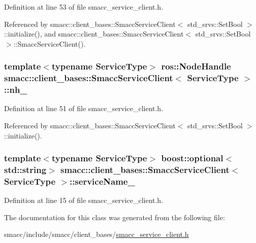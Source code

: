 Definition at line 53 of file smacc\+\_\+service\+\_\+client.\+h.



Referenced by smacc\+::client\+\_\+bases\+::\+Smacc\+Service\+Client$<$ std\+\_\+srvs\+::\+Set\+Bool $>$\+::initialize(), and smacc\+::client\+\_\+bases\+::\+Smacc\+Service\+Client$<$ std\+\_\+srvs\+::\+Set\+Bool $>$\+::\+Smacc\+Service\+Client().

\subsubsection[{\texorpdfstring{nh\+\_\+}{nh_}}]{\setlength{\rightskip}{0pt plus 5cm}template$<$typename Service\+Type$>$ ros\+::\+Node\+Handle {\bf smacc\+::client\+\_\+bases\+::\+Smacc\+Service\+Client}$<$ Service\+Type $>$\+::nh\+\_\+\hspace{0.3cm}{\ttfamily [protected]}}\hypertarget{classsmacc_1_1client__bases_1_1SmaccServiceClient_afb62982383b8269c7962cd1588537489}{}\label{classsmacc_1_1client__bases_1_1SmaccServiceClient_afb62982383b8269c7962cd1588537489}


Definition at line 51 of file smacc\+\_\+service\+\_\+client.\+h.



Referenced by smacc\+::client\+\_\+bases\+::\+Smacc\+Service\+Client$<$ std\+\_\+srvs\+::\+Set\+Bool $>$\+::initialize().

\subsubsection[{\texorpdfstring{service\+Name\+\_\+}{serviceName_}}]{\setlength{\rightskip}{0pt plus 5cm}template$<$typename Service\+Type$>$ boost\+::optional$<$std\+::string$>$ {\bf smacc\+::client\+\_\+bases\+::\+Smacc\+Service\+Client}$<$ Service\+Type $>$\+::service\+Name\+\_\+}\hypertarget{classsmacc_1_1client__bases_1_1SmaccServiceClient_a63732ec406cb8b6f65bbdbb73e01c7ab}{}\label{classsmacc_1_1client__bases_1_1SmaccServiceClient_a63732ec406cb8b6f65bbdbb73e01c7ab}


Definition at line 15 of file smacc\+\_\+service\+\_\+client.\+h.



The documentation for this class was generated from the following file\+:\begin{DoxyCompactItemize}
\item 
smacc/include/smacc/client\+\_\+bases/\hyperlink{smacc__service__client_8h}{smacc\+\_\+service\+\_\+client.\+h}\end{DoxyCompactItemize}
